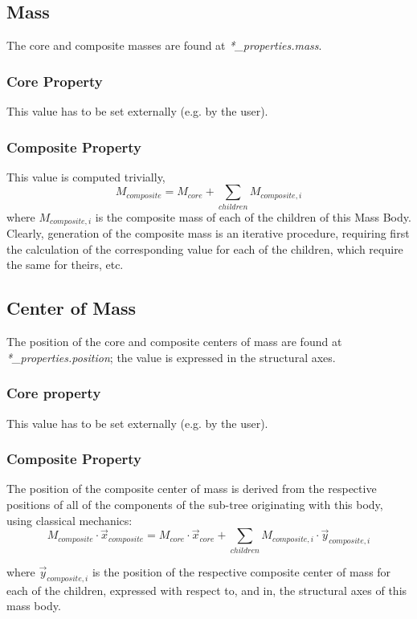 \subsection {Mass}
The core and composite masses are found at \textit{*\_properties.mass}.
\subsubsection {Core Property}
This value has to be set externally (e.g. by the user).
\subsubsection {Composite Property}
This value is computed trivially, 
\begin{equation}
  M_{composite} = M_{core} + \sum_{children} M_{composite,i}
\end{equation}
where $M_{composite,i}$ is the composite mass of each of the children of this 
Mass Body.  Clearly, generation of the composite mass is an iterative 
procedure, requiring first the calculation of the corresponding value for each 
of the children, which require the same for theirs, etc.

\subsection{Center of Mass}
The position of the core and composite centers of mass are found at 
\textit{*\_properties.position}; the value is expressed in the structural axes.
\subsubsection {Core property}
This value has to be set externally (e.g. by the user).
\subsubsection {Composite Property}
The position of the composite center of mass is derived from the respective 
positions of all of the components of the sub-tree originating with this body, 
using classical mechanics:
\begin{equation}
{M_{composite}} \cdot \vec{x}_{composite} = M_{core}  \cdot \vec{x}_{core}  + 
\sum_{children}{M_{composite,i} \cdot \vec{y}_{composite,i} }
\label{CoM_cal}
\end{equation}

where $\vec{y}_{composite,i} $ is the position of the respective composite 
center of mass for each of the children, expressed with respect to, and in, 
the structural axes of this mass body.

